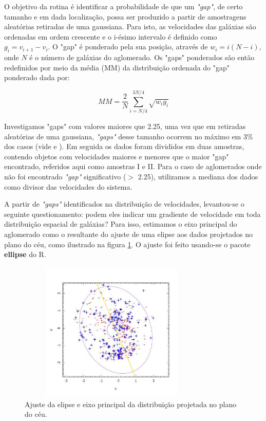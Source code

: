 O objetivo da rotina é identificar a probabilidade de que um \textit{"gap"},  de certo tamanho e em dada localização, possa ser produzido a partir de amostragens aleatórias retiradas de uma gaussiana. Para isto, as velocidades das galáxias são ordenadas em ordem crescente e o i-ésimo intervalo é definido como $g_i = v_{i+1} - v_i$. O "gap" é ponderado pela sua posição, através de $w_i=i(N-i)$, onde $N$ é o número de galáxias do aglomerado. Os "gaps" ponderados são então redefinidos por meio da média (MM) da distribuição ordenada do "gap" ponderado dada por: 

\begin{equation}
MM = \frac{2}{N} \sum_{i=N/4}^{3N/4} \sqrt{w_i g_i}
\label{eq:gappomderado}
\end{equation}

Investigamos "gaps" com valores maiores que 2.25, uma vez que em retiradas aleatórias de uma gaussiana, \textit{"gaps"} desse tamanho ocorrem no máximo em 3\% dos casos (vide  e ). Em seguida os dados foram divididos em duas amostras, contendo objetos com velocidades maiores e menores que o maior "gap" encontrado, referidos aqui como amostras I e II. Para o caso de aglomerados onde não foi encontrado \textit{"gap"} significativo ($>$ 2.25), utilizamos a mediana dos dados como divisor das velocidades do sistema.


A partir de \textit{"gaps"} identificados na distribuição de velocidades, levantou-se o seguinte questionamento: podem eles indicar um gradiente de velocidade em toda distribuição espacial de galáxias? Para isso, estimamos o eixo principal do aglomerado como o resultante do ajuste de uma elipse aos dados projetados no plano do céu, como ilustrado na figura \ref{elipse}. O ajuste foi feito usando-se o pacote \textbf{ellipse} do R.

\begin{figure}[H] %
\vspace{-2pt}
\begin{center}
\includegraphics[height=6.7cm,width=9cm]{04-figuras/elipse}%
\caption{Ajuste da elipse e eixo principal da distribuição projetada no plano do céu.}
\label{elipse}%
\end{center}
\end{figure}

